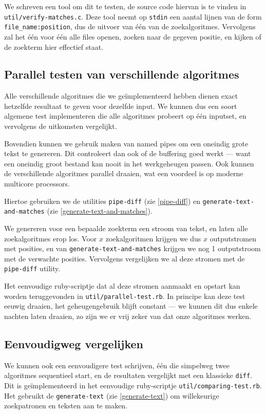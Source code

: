 \documentclass[a4paper,11pt]{article}
\begin{document}
We schreven een tool om dit te testen, de source code hiervan is te vinden in
\verb#util/verify-matches.c#. Deze tool neemt op \verb#stdin# een aantal lijnen
van de form \verb#file_name:position#, dus de uitvoer van \'e\'en van de
zoekalgoritmes. Vervolgens zal het \'e\'en voor \'e\'en alle files openen,
zoeken naar de gegeven positie, en kijken of de zoekterm hier effectief staat.

\subsection{Parallel testen van verschillende algoritmes}

Alle verschillende algoritmes die we ge\"implementeerd hebben dienen exact
hetzelfde resultaat te geven voor dezelfde input. We kunnen dus een soort
algemene test implementeren die alle algoritmes probeert op \'e\'en inputset, en
vervolgens de uitkomsten vergelijkt.

Bovendien kunnen we gebruik maken van named pipes om een oneindig grote tekst
te genereren. Dit controleert dan ook of de buffering goed werkt — want een
oneindig groot bestand kan nooit in het werkgeheugen passen. Ook kunnen de
verschillende algoritmes parallel draaien, wat een voordeel is op moderne
multicore processors.

Hiertoe gebruiken we de utilities \verb#pipe-diff# (zie \ref{pipe-diff}) en
\verb#generate-text-and-matches# (zie \ref{generate-text-and-matches}).

We genereren voor een bepaalde zoekterm een stroom van tekst, en laten
alle zoekalgoritmes erop los. Voor $x$ zoekalgoritmen krijgen we dus $x$
outputstromen met posities, en van \verb#generate-text-and-matches# krijgen we
nog 1 outputstroom met de verwachte posities. Vervolgens vergelijken we al deze
stromen met de \verb#pipe-diff# utility.

Het eenvoudige ruby-scriptje dat al deze stromen aanmaakt en opstart kan worden
teruggevonden in \verb#util/parallel-test.rb#. In principe kan deze test eeuwig
draaien, het geheugengebruik blijft constant — we kunnen dit dus enkele
nachten laten draaien, zo zijn we er vrij zeker van dat onze algoritmes werken.

\subsection{Eenvoudigweg vergelijken}

We kunnen ook een eenvoudigere test schrijven, \'e\'en die simpelweg twee
algoritmes sequentieel start, en de resultaten vergelijkt met een klassieke
\verb#diff#. Dit is ge\"implementeerd in het eenvoudige ruby-scriptje
\verb#util/comparing-test.rb#. Het gebruikt de \verb#generate-text# (zie
\ref{generate-text}) om willekeurige zoekpatronen en teksten aan te maken.
\end{document}
